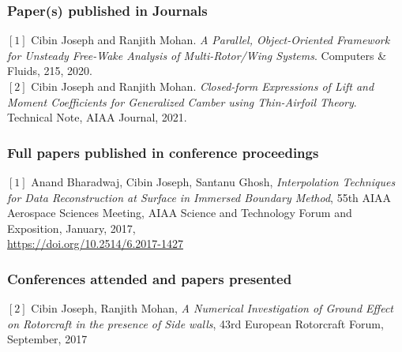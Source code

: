 \documentclass[11pt]{article}
\begin{document}
\subsubsection{Paper(s) published in Journals}
$[1]$ Cibin Joseph and Ranjith Mohan. \textit{A Parallel, Object-Oriented Framework for Unsteady Free-Wake Analysis of Multi-Rotor/Wing Systems}. Computers \& Fluids, 215, 2020.\\

\noindent
$[2]$ Cibin Joseph and Ranjith Mohan.
\textit{Closed-form Expressions of Lift and Moment Coefficients for Generalized Camber using Thin-Airfoil Theory}. Technical Note, AIAA Journal, 2021.
\subsubsection{Full papers published in conference proceedings}
$[1]$ Anand Bharadwaj, Cibin Joseph, Santanu Ghosh, \textit{Interpolation Techniques for Data Reconstruction at Surface in Immersed Boundary Method}, 55th AIAA Aerospace Sciences Meeting, AIAA Science and Technology Forum and Exposition, January, 2017, \\ \url{https://doi.org/10.2514/6.2017-1427}

\subsubsection{Conferences attended and papers presented}
\noindent$[2]$ Cibin Joseph, Ranjith Mohan, \textit{A Numerical Investigation of Ground Effect on Rotorcraft in the presence of Side walls}, 43rd European Rotorcraft Forum, September, 2017



\end{document}
